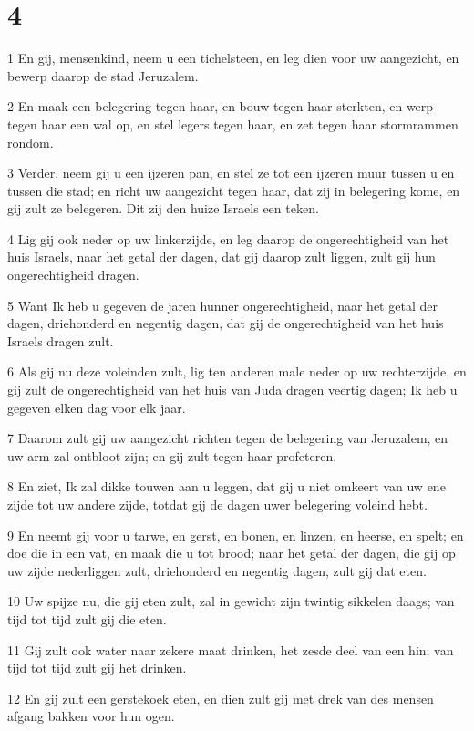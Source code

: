 \chapter{4}

\par 1 En gij, mensenkind, neem u een tichelsteen, en leg dien voor uw aangezicht, en bewerp daarop de stad Jeruzalem.
\par 2 En maak een belegering tegen haar, en bouw tegen haar sterkten, en werp tegen haar een wal op, en stel legers tegen haar, en zet tegen haar stormrammen rondom.
\par 3 Verder, neem gij u een ijzeren pan, en stel ze tot een ijzeren muur tussen u en tussen die stad; en richt uw aangezicht tegen haar, dat zij in belegering kome, en gij zult ze belegeren. Dit zij den huize Israels een teken.
\par 4 Lig gij ook neder op uw linkerzijde, en leg daarop de ongerechtigheid van het huis Israels, naar het getal der dagen, dat gij daarop zult liggen, zult gij hun ongerechtigheid dragen.
\par 5 Want Ik heb u gegeven de jaren hunner ongerechtigheid, naar het getal der dagen, driehonderd en negentig dagen, dat gij de ongerechtigheid van het huis Israels dragen zult.
\par 6 Als gij nu deze voleinden zult, lig ten anderen male neder op uw rechterzijde, en gij zult de ongerechtigheid van het huis van Juda dragen veertig dagen; Ik heb u gegeven elken dag voor elk jaar.
\par 7 Daarom zult gij uw aangezicht richten tegen de belegering van Jeruzalem, en uw arm zal ontbloot zijn; en gij zult tegen haar profeteren.
\par 8 En ziet, Ik zal dikke touwen aan u leggen, dat gij u niet omkeert van uw ene zijde tot uw andere zijde, totdat gij de dagen uwer belegering voleind hebt.
\par 9 En neemt gij voor u tarwe, en gerst, en bonen, en linzen, en heerse, en spelt; en doe die in een vat, en maak die u tot brood; naar het getal der dagen, die gij op uw zijde nederliggen zult, driehonderd en negentig dagen, zult gij dat eten.
\par 10 Uw spijze nu, die gij eten zult, zal in gewicht zijn twintig sikkelen daags; van tijd tot tijd zult gij die eten.
\par 11 Gij zult ook water naar zekere maat drinken, het zesde deel van een hin; van tijd tot tijd zult gij het drinken.
\par 12 En gij zult een gerstekoek eten, en dien zult gij met drek van des mensen afgang bakken voor hun ogen.
